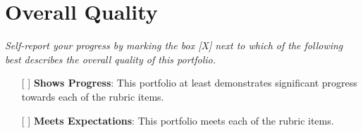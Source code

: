 \documentclass{article}
\begin{document}
\section{Overall Quality}
\textit{Self-report your progress by marking the box [X] next to
which of the following best describes the overall quality of
this portfolio.}

\begin{itemize}
\item[[ ]] \textbf{Shows Progress}: This portfolio at least demonstrates
significant progress towards each of the rubric items.

\item[[ ]] \textbf{Meets Expectations}: This portfolio meets
each of the rubric items.

\end{itemize}




\end{document}
